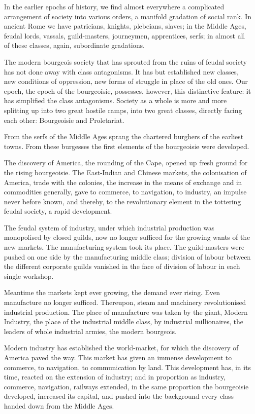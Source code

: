 \documentclass[, oneside]{article}   	%
\begin{document}
In the earlier epochs of history, we find almost everywhere a complicated arrangement of society into various orders, a manifold gradation of social rank. In ancient Rome we have patricians, knights, plebeians, slaves; in the Middle Ages, feudal lords, vassals, guild-masters, journeymen, apprentices, serfs; in almost all of these classes, again, subordinate gradations.

The modern bourgeois society that has sprouted from the ruins of feudal society has not done away with class antagonisms. It has but established new classes, new conditions of oppression, new forms of struggle in place of the old ones. Our epoch, the epoch of the bourgeoisie, possesses, however, this distinctive feature: it has simplified the class antagonisms. Society as a whole is more and more splitting up into two great hostile camps, into two great classes, directly facing each other: Bourgeoisie and Proletariat.

From the serfs of the Middle Ages sprang the chartered burghers of the earliest towns. From these burgesses the first elements of the bourgeoisie were developed.

The discovery of America, the rounding of the Cape, opened up fresh ground for the rising bourgeoisie. The East-Indian and Chinese markets, the colonisation of America, trade with the colonies, the increase in the means of exchange and in commodities generally, gave to commerce, to navigation, to industry, an impulse never before known, and thereby, to the revolutionary element in the tottering feudal society, a rapid development.

The feudal system of industry, under which industrial production was monopolised by closed guilds, now no longer sufficed for the growing wants of the new markets. The manufacturing system took its place. The guild-masters were pushed on one side by the manufacturing middle class; division of labour between the different corporate guilds vanished in the face of division of labour in each single workshop.

Meantime the markets kept ever growing, the demand ever rising. Even manufacture no longer sufficed. Thereupon, steam and machinery revolutionised industrial production. The place of manufacture was taken by the giant, Modern Industry, the place of the industrial middle class, by industrial millionaires, the leaders of whole industrial armies, the modern bourgeois.

Modern industry has established the world-market, for which the discovery of America paved the way. This market has given an immense development to commerce, to navigation, to communication by land. This development has, in its time, reacted on the extension of industry; and in proportion as industry, commerce, navigation, railways extended, in the same proportion the bourgeoisie developed, increased its capital, and pushed into the background every class handed down from the Middle Ages.
\end{document}
